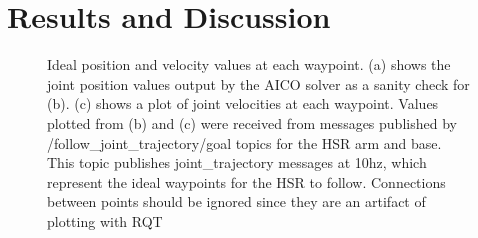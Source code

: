 \documentclass[12pt]{article}
\begin{document}
    \section{Results and Discussion}
        \begin{figure}
            \centering
            \quad
            \caption{Ideal position and velocity values at each waypoint. (a) shows the joint position values output by the AICO solver as a sanity check for (b). (c) shows a plot of joint velocities at each waypoint. Values plotted from (b) and (c) were received from messages published by /follow\_joint\_trajectory/goal topics for the HSR arm and base. This topic publishes joint\_trajectory messages at 10hz, which represent the ideal waypoints for the HSR to follow. Connections between points should be ignored since they are an artifact of plotting with RQT}
            \label{fig:IdealTraj}
        \end{figure}
\end{document}
